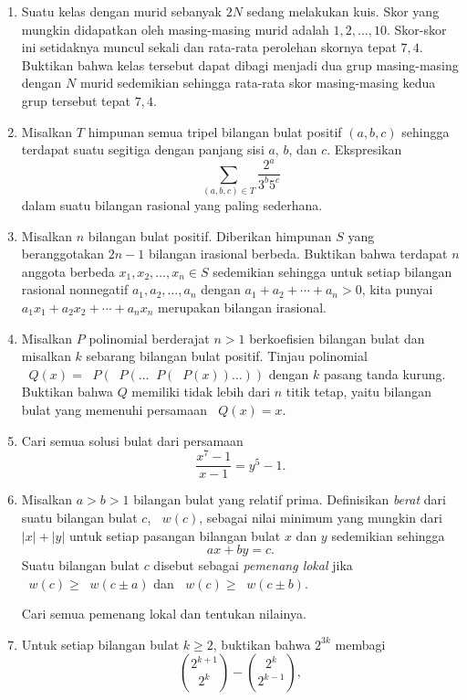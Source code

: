 \documentclass[12pt]{article}
\newcommand*\func[2]{\mathop{}\!{#1}{\left({#2}\right)}}
\begin{document}
\begin{enumerate}[leftmargin=*]
		\item Suatu kelas dengan murid sebanyak $ 2N $ sedang melakukan kuis. Skor yang mungkin didapatkan oleh masing-masing murid adalah $ 1, 2, \dots, 10 $. Skor-skor ini setidaknya muncul sekali dan rata-rata perolehan skornya tepat $ 7,4 $. Buktikan bahwa kelas tersebut dapat dibagi menjadi dua grup masing-masing dengan $ N $ murid sedemikian sehingga rata-rata skor masing-masing kedua grup tersebut tepat $ 7,4 $.
		\item Misalkan $ T $ himpunan semua tripel bilangan bulat positif $ \left(a, b, c\right) $ sehingga terdapat suatu segitiga dengan panjang sisi $ a $, $ b $, dan $ c $. Ekspresikan
		\[ \sum_{\left(a, b, c\right) \in T}{\frac{2^{a}}{3^{b}5^{c}}} \]
		dalam suatu bilangan rasional yang paling sederhana.
		\item Misalkan $ n $ bilangan bulat positif. Diberikan himpunan $ S $ yang beranggotakan $ 2n - 1 $ bilangan irasional berbeda. Buktikan bahwa terdapat $ n $ anggota berbeda $ x_{1}, x_{2}, \dots, x_{n} \in S $ sedemikian sehingga untuk setiap bilangan rasional nonnegatif $ a_{1}, a_{2}, \dots, a_{n} $ dengan $ a_{1} + a_{2} + \cdots + a_{n} > 0 $, kita punyai $ a_{1}x_{1} + a_{2}x_{2} + \cdots + a_{n}x_{n} $ merupakan bilangan irasional.
		\item Misalkan $ P $ polinomial berderajat $ n > 1 $ berkoefisien bilangan bulat dan misalkan $ k $ sebarang bilangan bulat positif. Tinjau polinomial $ \func{Q}{x} = \func{P}{\func{P}{\dots \func{P}{\func{P}{x}} \dots}} $ dengan $ k $ pasang tanda kurung. Buktikan bahwa $ Q $ memiliki tidak lebih dari $ n $ titik tetap, yaitu bilangan bulat yang memenuhi persamaan $ \func{Q}{x} = x $.
		\item Cari semua solusi bulat dari persamaan
		\[ \frac{x^{7} - 1}{x - 1} = y^{5} - 1. \]
		\item Misalkan $ a > b > 1 $ bilangan bulat yang relatif prima. Definisikan \textit{berat} dari suatu bilangan bulat $ c $, $ \func{w}{c} $, sebagai nilai minimum yang mungkin dari $ \left|x\right| + \left|y\right| $ untuk setiap pasangan bilangan bulat $ x $ dan $ y $ sedemikian sehingga
		\[ ax + by = c. \]
		Suatu bilangan bulat $ c $ disebut sebagai \textit{pemenang lokal} jika $ \func{w}{c} \geq \func{w}{c \pm a} $ dan $ \func{w}{c} \geq \func{w}{c \pm b} $.
		\par \noindent Cari semua pemenang lokal dan tentukan nilainya.
		\item Untuk setiap bilangan bulat $ k \geq 2 $, buktikan bahwa $ 2^{3k} $ membagi
		\[ \binom{2^{k + 1}}{2^{k}} - \binom{2^{k}}{2^{k - 1}}, \]

\end{enumerate}
\end{document}
